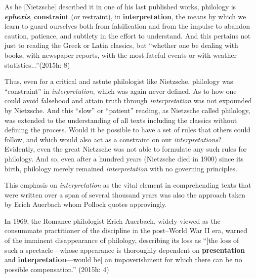 \begin{myquote}
As he [Nietzsche] described it in one of his last published works, philology is \textit{\textbf{ephexis}}, \textbf{constraint} (or restraint), in \textbf{interpretation}, the means by which we learn to guard ourselves both from falsification and from the impulse to abandon caution, patience, and subtlety in the effort to understand. And this pertains not just to reading the Greek or Latin classics, but “whether one be dealing with books, with newspaper reports, with the most fateful events or with weather statistics...”\break (2015h: 8)
\end{myquote}

Thus, even for a critical and astute philologist like Nietzsche, philology was “constraint” in \textit{interpretation}, which was again never defined. As to how one could avoid falsehood and attain truth through \textit{interpretation} was not expounded by Nietzsche. And this “slow” or “patient” reading, as Nietzsche called philology, was extended to the understanding of all texts including the classics without defining the process. Would it be possible to have a set of rules that others could follow, and which would also act as a constraint on our \textit{interpretations}? Evidently, even the great Nietzsche was not able to formulate any such rules for philology. And so, even after a hundred years (Nietzsche died in 1900) since its birth, philology merely remained \textit{interpretation} with no governing principles.

This emphasis on \textit{interpretation} as the vital element in comprehending texts that were written over a span of several thousand years was also the approach taken by Erich Auerbach whom Pollock quotes approvingly.

\begin{myquote}
In 1969, the Romance philologist Erich Auerbach, widely viewed as the consummate practitioner of the discipline in the post–World War II era, warned of the imminent disappearance of philology, describing its loss as “[the loss of such a spectacle—whose appearance is thoroughly dependent on \textbf{presentation} and \textbf{interpretation}—would be] an impoverishment for which there can be no possible compensation.” (2015h: 4)
\end{myquote}

